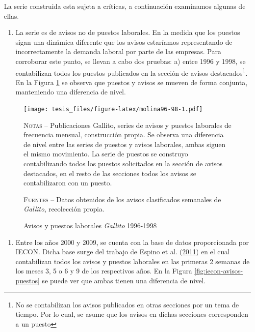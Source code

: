 \documentclass[12pt,oneside]{reedthesis}
\providecommand{\tightlist}{%
  \setlength{\itemsep}{0pt}\setlength{\parskip}{0pt}}
\begin{document}
La serie construida esta sujeta a críticas, a continuación examinamos algunas de ellas.
\begin{enumerate}
\def\labelenumi{\arabic{enumi}.}
\tightlist
\item
  La serie es de avisos no de puestos laborales. En la medida que los puestos sigan una dinámica diferente que los avisos estaríamos representando de incorrectamente la demanda laboral por parte de las empresas. Para corroborar este punto, se llevan a cabo dos pruebas: a) entre 1996 y 1998, se contabilizan todos los puestos publicados en la sección de avisos destacados\footnote{No se contabilizan los avisos publicados en otras secciones por un tema de tiempo. Por lo cual, se asume que los avisos en dichas secciones corresponden a un puesto}. En la Figura \ref{fig:molina96-98} se observa que puestos y avisos se mueven de forma conjunta, manteniendo una diferencia de nivel.
\end{enumerate}
\begin{figure}
\texttt{[image: tesis\_files/figure-latex/molina96-98-1.pdf]}
\caption{Avisos y puestos laborales \textit{Gallito} 1996-1998}\label{fig:molina96-98}\textsc{}

\footnotesize\textsc{Notas} -- Publicaciones Gallito, series de avisos y puestos laborales de frecuencia mensual, construcción propia. Se observa una diferencia de nivel entre las series de puestos y avisos laborales, ambas siguen el mismo movimiento. La serie de puestos se construyo contabilizando todos los puestos solicitados en la sección de avisos destacados, en el resto de las secciones todos los avisos se contabilizaron con un puesto.

\textsc{Fuentes} -- Datos obtenidos de los avisos clasificados semanales de \textit{Gallito}, recolección propia.
\end{figure}
\begin{enumerate}
\def\labelenumi{\alph{enumi})}
\setcounter{enumi}{1}
\tightlist
\item
  Entre los años 2000 y 2009, se cuenta con la base de datos proporcionada por IECON. Dicha base surge del trabajo de Espino et al. (\protect\hyperlink{ref-Alma2011}{2011}) en el cual contabilizan todos los avisos y puestos laborales en las primeras 2 semanas de los meses 3, 5 o 6 y 9 de los respectivos años. En la Figura \ref{fig:iecon-avisos-puestos} se puede ver que ambas tienen una diferencia de nivel.
\end{enumerate}
\end{document}
